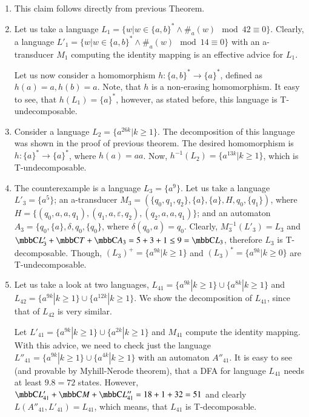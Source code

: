 \paragraph{}
\dokaz
\begin{enumerate}
\item This claim follows directly from previous Theorem.

\item Let us take a language $L_1 = \{w|w \in \{ a,b\}^* \wedge \#_{a}(w) \mod 42 \equiv 0 \}$. Clearly, a language $L'_1 = \{w|w \in \{ a,b\}^* \wedge \#_{a}(w) \mod 14 \equiv 0 \}$ with an a-transducer $M_1$ computing the identity mapping is an effective advice for $L_1$.

Let us now consider a homomorphism $h: \{ a,b\}^* \to \{ a \}^*$, defined as $h(a) = a, h(b) = a$. Note, that $h$ is a non-erasing homomorphism. It easy to see, that $h(L_1) = \{ a \}^*$, however, as stated before, this language is T-undecomposable.

\item Consider a language $L_2 = \{ a^{26k} | k \geq 1 \}$. The decomposition of this language was shown in the proof of previous theorem. The desired homomorphism is $h: \{a\}^* \to \{a\}^*$, where $h(a) = aa$. Now, $h^{-1}(L_2) = \{ a^{13k} | k \geq 1 \}$, which is T-undecomposable.

\item The counterexample is a language $L_3 = \{ a^{9} \}$. Let us take a language $L'_3 = \{ a^{5} \}$; an a-transducer $M_3 = (\{q_0, q_1, q_2\}, \{a\}, \{a\}, H, q_0, \{q_1\})$, where $H = \{ (q_0, a, a, q_1), (q_1, a, \varepsilon, q_2),\allowbreak (q_2, a, a, q_1) \}$; and an automaton $A_3 = \{q_0, \{a\}, \delta, q_0, \{q_0\} $, where $\delta(q_0, a) = q_0$. Clearly, $M_3^{-1}(L'_3) = L_3$ and $\C{L'_3} + \C{T} + \C{A_3} = 5 + 3 + 1 \leq 9 = \C{L_3}$, therefore $L_3$ is T-decomposable. Though, $(L_3)^+ = \{ a^{9k} | k \geq 1 \}$ and $(L_3)^* = \{ a^{9k} | k \geq 0 \}$ are T-undecomposable.

\item Let us take a look at two languages, $L_{41} = \{ a^{9k} | k \geq 1 \} \cup \{ a^{8k} | k \geq 1 \}$ and $L_{42} = \{ a^{9k} | k \geq 1 \} \cup \{ a^{12k} | k \geq 1 \}$. We show the decomposition of $L_{41}$, since that of $L_{42}$ is very similar.

Let $L'_{41} = \{ a^{9k} | k \geq 1 \} \cup \{ a^{2k} | k \geq 1 \}$ and $M_{41}$ compute the identity mapping. With this advice, we need to check just the language $L''_{41} = \{ a^{9k} | k \geq 1 \} \cup \{ a^{4k} | k \geq 1 \}$ with an automaton $A''_{41}$. It is easy to see (and provable by Myhill-Nerode theorem), that a DFA for language $L_{41}$ needs at least $9.8 = 72$ states. However, $\C{L'_{41}} + \C{M} + \C{L''_{41}} = 18 + 1 + 32 = 51$ and clearly $L(A''_{41}, L'_{41}) = L_{41}$, which means, that $L_{41}$ is T-decomposable.


\end{enumerate}
